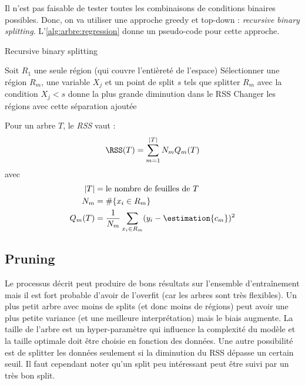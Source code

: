     Il n'est pas faisable de tester toutes les combinaisons de conditions binaires possibles. Donc, on va utiliser une approche greedy et top-down : \textit{recursive binary splitting}. L'\cref{alg:arbre:regression} donne un pseudo-code pour cette approche.

    \begin{algorithm}
        \caption{Recursive binary splitting}
        \label{alg:arbre:regression}
        \begin{algorithmic}[1]
            \State Soit \(R_1\) une seule région (qui couvre l'entièreté de l'espace)
            \DoUntil
                \State Sélectionner une région \(R_m\), une variable \(X_j\) et un point de split \(s\) tels que splitter \(R_m\) avec la condition \(X_j < s\) donne la plus grande diminution dans le RSS
                \State Changer les régions avec cette séparation ajoutée
        \end{algorithmic}
    \end{algorithm}

    \begin{definition}
        Pour un arbre \(T\), le \textit{RSS} vaut :
        \[
            \RSS(T) = \sum_{m = 1}^{|T|} N_m Q_m(T)
        \]
        avec
        \begin{align*}
            |T| &= \text{le nombre de feuilles de } T\\
            N_m &= \#\{x_i \in R_m\}\\
            Q_m(T) &= \frac{1}{N_m} \sum_{x_i \in R_m} (y_i - \estimation{c_m})^2
        \end{align*}
    \end{definition}

    \subsection{Pruning}
        Le processus décrit peut produire de bons résultats sur l'ensemble d'entraînement mais il est fort probable d'avoir de l'overfit (car les arbres sont très flexibles). Un plus petit arbre avec moins de splits (et donc moins de régions) peut avoir une plus petite variance (et une meilleure interprétation) mais le biais augmente. La taille de l'arbre est un hyper-paramètre qui influence la complexité du modèle et la taille optimale doit être choisie en fonction des données. Une autre possibilité est de splitter les données seulement si la diminution du RSS dépasse un certain seuil. Il faut cependant noter qu'un split peu intéressant peut être suivi par un très bon split.


